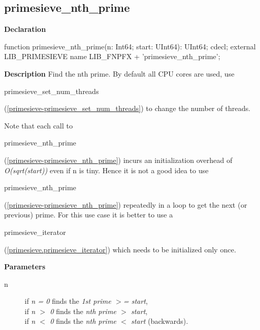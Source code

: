 \documentclass{report}
\newif\ifpdf
\begin{document}
\subsection*{primesieve{\_}nth{\_}prime}
\fi
\label{primesieve-primesieve_nth_prime}
\begin{list}{}{
\setlength{\itemindent}{0cm}
\setlength{\listparindent}{0cm}
\setlength{\leftmargin}{\evensidemargin}
\addtolength{\leftmargin}{\tmplength}
\settowidth{\labelsep}{X}
\addtolength{\leftmargin}{\labelsep}
\setlength{\labelwidth}{\tmplength}
}
\item[\textbf{Declaration}\hfill]
\ifpdf
\begin{flushleft}
\fi
\begin{ttfamily}
function primesieve{\_}nth{\_}prime(n: Int64; start: UInt64): UInt64; cdecl; external LIB{\_}PRIMESIEVE name LIB{\_}FNPFX + 'primesieve{\_}nth{\_}prime';\end{ttfamily}

\ifpdf
\end{flushleft}
\fi

\par
\item[\textbf{Description}]
Find the nth prime. By default all CPU cores are used, use \begin{ttfamily}primesieve{\_}set{\_}num{\_}threads\end{ttfamily}(\ref{primesieve-primesieve_set_num_threads}) to change the number of threads.

Note that each call to \begin{ttfamily}primesieve{\_}nth{\_}prime\end{ttfamily}(\ref{primesieve-primesieve_nth_prime}) incurs an initialization overhead of \textit{O(sqrt(start))} even if n is tiny. Hence it is not a good idea to use \begin{ttfamily}primesieve{\_}nth{\_}prime\end{ttfamily}(\ref{primesieve-primesieve_nth_prime}) repeatedly in a loop to get the next (or previous) prime. For this use case it is better to use a \begin{ttfamily}primesieve{\_}iterator\end{ttfamily}(\ref{primesieve.primesieve_iterator}) which needs to be initialized only once.

\par
\item[\textbf{Parameters}]
\begin{description}
\item[n] if \textit{n = 0} finds the \textit{1st prime {$>$}= start},\\{} if \textit{n {$>$} 0} finds the \textit{nth prime {$>$} start},\\{} if \textit{n {$<$} 0} finds the \textit{nth prime {$<$} start} (backwards).
\end{description}


\end{list}
\ifpdf
\end{document}
